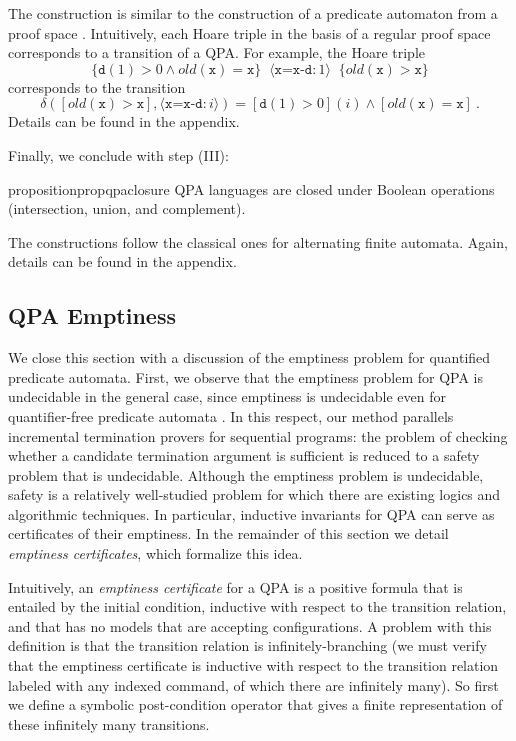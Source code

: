 \documentclass[9pt,nocopyrightspace]{sigplanconf}
\theoremstyle{definition}
\newcommand{\tuple}[1]{\langle #1 \rangle}
\newcommand{\hoare}[3]{\{{#1}\}\;\;#2\;\;\{{#3}\}}
\newcommand{\ic}[2]{{\tuple{#1 : #2}}}
\newcommand{\old}[1]{\textit{old}(#1)}
\begin{document}
The construction is similar to the construction of a predicate automaton from a proof space \cite{Farzan2015}.  Intuitively, each Hoare triple in the basis of a regular proof
space corresponds to a transition of a QPA.  For example, the Hoare triple
\[\hoare{\texttt{d}(1) > 0 \land \old{\texttt{x}}=\texttt{x}}{\ic{\texttt{x=x-d}}{1}}{\old{\texttt{x}}>\texttt{x}}\]
corresponds to the transition
\[\delta([\old{\texttt{x}}>\texttt{x}], \ic{\texttt{x=x-d}}{i}) = [\texttt{d}(1)>0](i) \land [\old{\texttt{x}}=\texttt{x}]\ . \]
Details can be found in the appendix.

Finally, we conclude with step (III):
\begin{restatable}{proposition}{propqpaclosure}
\label{prop:qpa-closure}
  QPA languages are closed under Boolean operations (intersection, union, and
  complement).
\end{restatable}
The constructions follow the classical ones for alternating finite automata.  Again, details can be found in the appendix.




\subsection{QPA Emptiness}

We close this section with a discussion of the emptiness problem for
quantified predicate automata.  First, we observe that the emptiness problem
for QPA is undecidable in the general case, since emptiness is undecidable
even for quantifier-free predicate automata \cite{Farzan2015}.  In this
respect, our method parallels incremental termination provers for sequential
programs: the problem of checking whether a candidate termination
argument is sufficient is reduced to a safety problem that is undecidable.
Although the emptiness problem is undecidable, safety is a relatively
well-studied problem for which there are existing logics and algorithmic
techniques.  In particular, inductive invariants for QPA can serve as
certificates of their emptiness.  In the remainder of this section we
detail \emph{emptiness certificates}, which formalize this idea.



Intuitively, an \emph{emptiness certificate} for a QPA is a positive formula
that is entailed by the initial condition, inductive with respect to the
transition relation, and that has no models that are accepting
configurations.  A problem with this definition is that the transition
relation is infinitely-branching (we must verify that the emptiness
certificate is inductive with respect to the transition relation labeled with
any indexed command, of which there are infinitely many).  So first we define
a symbolic post-condition operator that gives a finite representation of these
infinitely many transitions.
\end{document}
